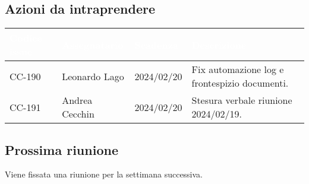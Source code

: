 \subsection{Azioni da intraprendere}
{
    \setlength{\tabcolsep}{10pt}
            \renewcommand{\arraystretch}{1.5}
            \begin{xltabular}{\textwidth}{| l | l | l | X |}
                 \hline
                 \textbf{\textcolor{white}{Codice issue}} & \textbf{\textcolor{white}{Assegnatario}} & \textbf{\textcolor{white}{Scadenza}} & \textbf{\textcolor{white}{Descrizione}} \\
                 \hline
                 CC-190 & Leonardo Lago & 2024/02/20 & Fix automazione log e frontespizio documenti.\\
                 \hline
                 CC-191 & Andrea Cecchin & 2024/02/20 & Stesura verbale riunione 2024/02/19.\\
                 \hline
                 
            \end{xltabular}
}

\subsection{Prossima riunione} \label{subsec:riunione}
Viene fissata una riunione per la settimana successiva.